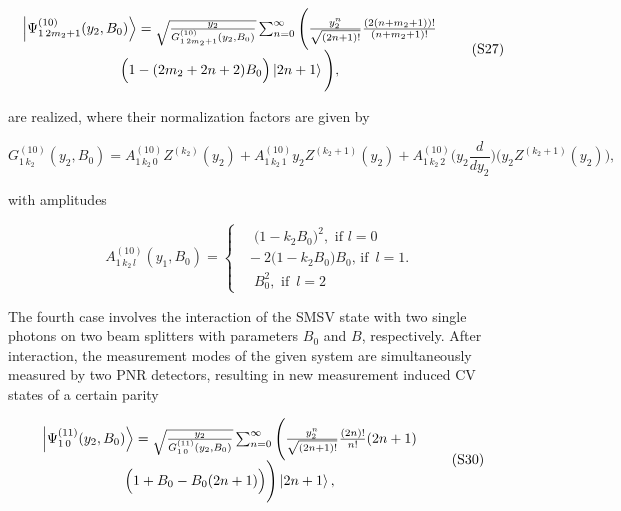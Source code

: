 \documentclass{optica-article}
\begin{document}
\begin{equation}\label{eq:S27}
    \begin{array}{c}
         \ket{\Psi_{1\,2m_2+1}^{(10)}(y_2,B_0)} =
         \sqrt{\frac{y_2}{G_{1\,2m_2+1}^{(10)}(y_2,B_0)}}\sum_{n=0}^{\infty} \Bigg (\frac{y_2^{n}}{\sqrt{(2n+1)!}}
         \frac{(2(n+m_2+1))!}{(n+m_2+1)!}\\
         \Big(1-(2m_2+2n+2)B_0\Big)\ket{2n+1}\Bigg),
    \end{array}
    \tag{S27}
\end{equation}


\!\!\!\!\!\!are realized, where their normalization factors are given by  

\begin{equation}\label{eq:S28}
    G_{1\,k_2}^{(10)}(y_2,B_0) = A^{(10)}_{1\,k_2\,0}Z^{(k_2)}(y_2) + 
    A^{(10)}_{1\,k_2\,1}y_2Z^{(k_2+1)}(y_2) + 
    A^{(10)}_{1\,k_2\,2}\Big(y_2\frac{d}{dy_2}\Big)\Big(y_2Z^{(k_2+1)}(y_2)\Big), 
\tag{S28}
\end{equation}

\!\!\!\!\!\!with amplitudes   



\begin{equation}\label{eq:S29}
    A_{1\,k_2\,l}^{(10)}(y_1,B_0) =
    \begin{cases}
            \,\,\,\,\,\,\Big(1-k_2B_0\Big)^2,
            \,\,\text{if}\,\, l = 0 \\[3ex]
			\,\,\,-2\Big(1-k_2B_0\Big)B_0,\,\text{if} \,\,\,l = 1 .\\[3ex]
			\,\,\,\,\,\,B_0^2,\,
            \,\text{if} \,\,\,l = 2
	\end{cases}
\tag{S29}
\end{equation}


\par The fourth case involves the interaction of the SMSV state with two single photons on two beam splitters with parameters $B_0$ and $B$, respectively. After interaction, the measurement modes of the given system are simultaneously measured by two PNR detectors, resulting in new measurement induced CV states of a certain parity


\begin{equation}\label{eq:S30}
    \begin{array}{c}
         \ket{\Psi_{1\,0}^{(11)}(y_2,B_0)} =
         \sqrt{\frac{y_2}{G_{1\,0}^{(11)}(y_2,B_0)}}\sum_{n=0}^{\infty} \Bigg (\frac{y_2^{n}}{\sqrt{(2n+1)!}}
         \frac{(2n)!}{n!}(2n+1)\\
         \Big(1+B_0-B_0(2n+1)\Big)\Bigg)\ket{2n+1},
    \end{array}
    \tag{S30}
\end{equation}
\end{document}
